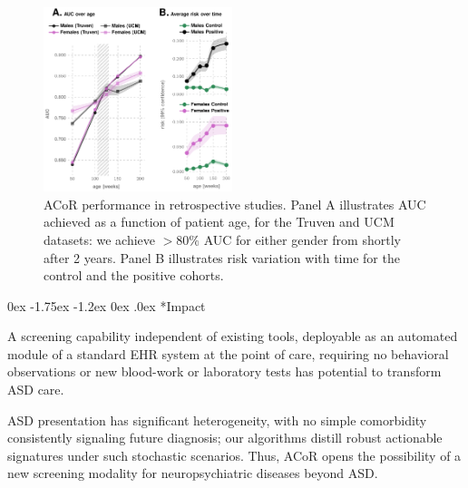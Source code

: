 \documentclass[onecolumn, compsoc,11pt]{IEEEtran}
\makeatletter
\renewcommand\subsection{\@startsection {subsection}{2}{\z@}%
                                   {0ex \@plus -1.75ex \@minus -1.2ex}%
                                   {0ex \@plus.0ex}%
                                   {\fontsize{11}{11}\selectfont\bfseries\sffamily\color{black}}}
\renewcommand{\captionN}[1]{\caption{\color{CadetBlue4!80!black} \sffamily \fontsize{9}{10}\selectfont #1  }}
\def\acor{ACoR\xspace}
\makeatother
\begin{document}
\begin{figure}
  \vspace{-12pt}
  
  \centering 
   \includegraphics[width=0.49\textwidth]{Figures/perf1}
   \vspace{-28pt}

    \captionN{\acor performance in retrospective studies. Panel A illustrates AUC achieved as a function of
      patient age, for the Truven and UCM datasets: we achieve $>80\%$ AUC for either gender from shortly after 2 years.   Panel B illustrates  risk variation with time for the control and the positive cohorts. %
    }\label{fig2}
       \vspace{-15pt}

\end{figure}
\subsection*{Impact}

A  screening capability  independent of existing tools, deployable as an automated module  of a standard EHR system at the point of care, requiring no behavioral observations or  new blood-work or laboratory tests has potential to transform ASD care. 

ASD presentation has significant heterogeneity, with no simple comorbidity  consistently signaling future  diagnosis; our algorithms distill robust actionable signatures under such stochastic scenarios. Thus,  \acor opens the possibility of a new screening modality for  neuropsychiatric diseases beyond ASD.
\end{document}
